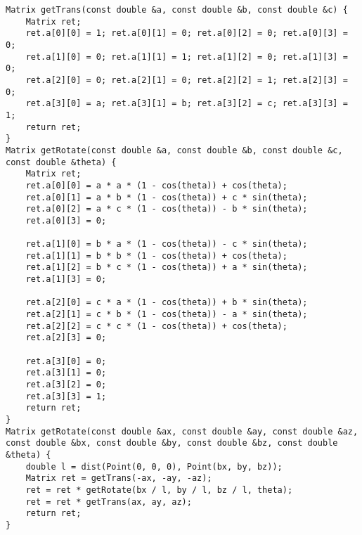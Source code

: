 \begin{lstlisting}
Matrix getTrans(const double &a, const double &b, const double &c) {
    Matrix ret;
    ret.a[0][0] = 1; ret.a[0][1] = 0; ret.a[0][2] = 0; ret.a[0][3] = 0;
    ret.a[1][0] = 0; ret.a[1][1] = 1; ret.a[1][2] = 0; ret.a[1][3] = 0;
    ret.a[2][0] = 0; ret.a[2][1] = 0; ret.a[2][2] = 1; ret.a[2][3] = 0;
    ret.a[3][0] = a; ret.a[3][1] = b; ret.a[3][2] = c; ret.a[3][3] = 1;
    return ret;
}
Matrix getRotate(const double &a, const double &b, const double &c, const double &theta) {
    Matrix ret;
    ret.a[0][0] = a * a * (1 - cos(theta)) + cos(theta);
    ret.a[0][1] = a * b * (1 - cos(theta)) + c * sin(theta);
    ret.a[0][2] = a * c * (1 - cos(theta)) - b * sin(theta);
    ret.a[0][3] = 0;
    
    ret.a[1][0] = b * a * (1 - cos(theta)) - c * sin(theta);
    ret.a[1][1] = b * b * (1 - cos(theta)) + cos(theta);
    ret.a[1][2] = b * c * (1 - cos(theta)) + a * sin(theta);
    ret.a[1][3] = 0;
    
    ret.a[2][0] = c * a * (1 - cos(theta)) + b * sin(theta);
    ret.a[2][1] = c * b * (1 - cos(theta)) - a * sin(theta);
    ret.a[2][2] = c * c * (1 - cos(theta)) + cos(theta);
    ret.a[2][3] = 0;
    
    ret.a[3][0] = 0;
    ret.a[3][1] = 0;
    ret.a[3][2] = 0;
    ret.a[3][3] = 1;
    return ret;
}
Matrix getRotate(const double &ax, const double &ay, const double &az, const double &bx, const double &by, const double &bz, const double &theta) {
    double l = dist(Point(0, 0, 0), Point(bx, by, bz));
    Matrix ret = getTrans(-ax, -ay, -az);
    ret = ret * getRotate(bx / l, by / l, bz / l, theta);
    ret = ret * getTrans(ax, ay, az);
    return ret;
}
\end{lstlisting}
